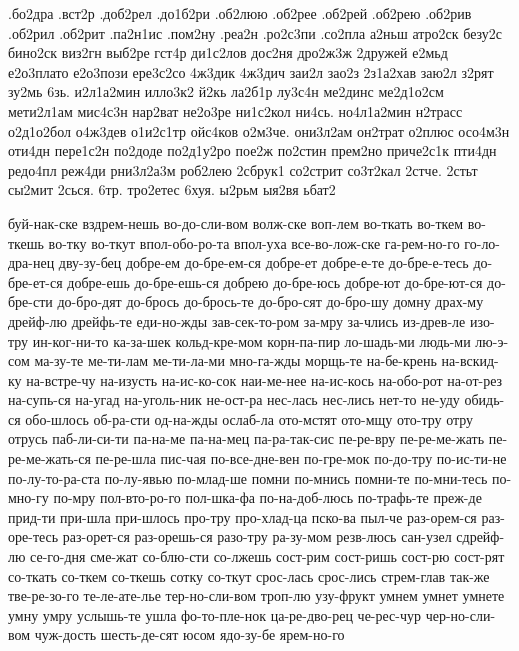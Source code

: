 %

.бо2дра
.вст2р
.доб2рел
.до1б2ри
.об2люю
.об2рее
.об2рей
.об2рею
.об2рив
.об2рил
.об2рит
.па2н1ис
.пом2ну
.реа2н
.ро2с3пи
.со2пла
а2ньш
атро2ск
безу2с
бино2ск
виз2гн
выб2ре
гст4р
ди1с2лов
дос2ня
дро2ж3ж
2дружей
е2мьд
е2о3плато
е2о3пози
ере3с2со
4ж3дик
4ж3дич
заи2л
зао2з
2з1а2хав
заю2л
з2рят
зу2мь
6зь.
и2л1а2мин
илло3к2
й2кь
ла2б1р
лу3с4н
ме2динс
ме2д1о2см
мети2л1ам
мис4с3н
нар2ват
не2о3ре
ни1с2кол
ни4сь.
но4л1а2мин
н2трасс
о2д1о2бол
о4ж3дев
о1и2с1тр
ойс4ков
о2м3че.
они3л2ам
он2трат
о2плюс
осо4м3н
оти4дн
пере1с2н
по2доде
по2д1у2ро
пое2ж
по2стин
прем2но
приче2с1к
пти4дн
редо4пл
реж4ди
рни3л2а3м
роб2лею
2сбрук1
со2стрит
со3т2кал
2стче.
2стьт
сы2мит
2сься.
6тр.
тро2етес
6хуя.
ы2рьм
ыя2вя
ьбат2



буй-нак-ске
вздрем-нешь
во-до-сли-вом
волж-ске
воп-лем
во-ткать
во-ткем
во-ткешь
во-тку
во-ткут
впол-обо-ро-та
впол-уха
все-во-лож-ске
га-рем-но-го
го-ло-дра-нец
дву-зу-бец
добре-ем
до-бре-ем-ся
добре-ет
добре-е-те
до-бре-е-тесь
до-бре-ет-ся
добре-ешь
до-бре-ешь-ся
добрею
до-бре-юсь
добре-ют
до-бре-ют-ся
до-бре-сти
до-бро-дят
до-брось
до-брось-те
до-бро-сят
до-бро-шу
домну
драх-му
дрейф-лю
дрейфь-те
еди-но-жды
зав-сек-то-ром
за-мру
за-члись
из-древ-ле
изо-тру
ин-ког-ни-то
ка-за-шек
кольд-кре-мом
корн-па-пир
ло-шадь-ми
людь-ми
лю-э-сом
ма-зу-те
ме-ти-лам
ме-ти-ла-ми
мно-га-жды
морщь-те
на-бе-крень
на-вскид-ку
на-встре-чу
на-изусть
на-ис-ко-сок
наи-ме-нее
на-ис-кось
на-обо-рот
на-от-рез
на-супь-ся
на-угад
на-уголь-ник
не-ост-ра
нес-лась
нес-лись
нет-то
не-уду
обидь-ся
обо-шлось
об-ра-сти
од-на-жды
ослаб-ла
ото-мстят
ото-мщу
ото-тру
отру
отрусь
паб-ли-си-ти
па-на-ме
па-на-мец
па-ра-так-сис
пе-ре-вру
пе-ре-ме-жать
пе-ре-ме-жать-ся
пе-ре-шла
пис-чая
по-все-дне-вен
по-гре-мок
по-до-тру
по-ис-ти-не
по-лу-то-ра-ста
по-лу-явью
по-млад-ше
помни
по-мнись
помни-те
по-мни-тесь
по-мно-гу
по-мру
пол-вто-ро-го
пол-шка-фа
по-на-доб-люсь
по-трафь-те
преж-де
прид-ти
при-шла
при-шлось
про-тру
про-хлад-ца
пско-ва
пыл-че
раз-орем-ся
раз-оре-тесь
раз-орет-ся
раз-орешь-ся
разо-тру
ра-зу-мом
резв-люсь
сан-узел
сдрейф-лю
се-го-дня
сме-жат
со-блю-сти
со-лжешь
сост-рим
сост-ришь
сост-рю
сост-рят
со-ткать
со-ткем
со-ткешь
сотку
со-ткут
срос-лась
срос-лись
стрем-глав
так-же
тве-ре-зо-го
те-ле-ате-лье
тер-но-сли-вом
троп-лю
узу-фрукт
умнем
умнет
умнете
умну
умру
услышь-те
ушла
фо-то-пле-нок
ца-ре-дво-рец
че-рес-чур
чер-но-сли-вом
чуж-дость
шесть-де-сят
юсом
ядо-зу-бе
ярем-но-го



